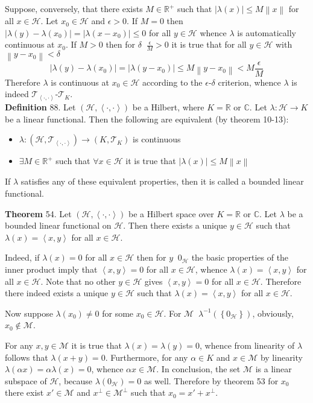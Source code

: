 \documentclass[a4paper]{article}
\newcommand{\obj}[1]{\left\{ #1 \right \}}
\newcommand{\brac}[1]{\left ( #1 \right )}
\newcommand{\abs}[1]{\left | #1 \right |}
\newcommand{\nrm}[1]{\left\| #1 \right \|}
\newcommand{\brkt}[1]{\left\langle #1 \right\rangle}
\newcommand{\Real}{\mathbb{R}}
\newcommand{\Cplx}{\mathbb{C}}
\newcommand{\Tcal}{\mathcal{T}}
\newcommand{\Hcal}{\mathcal{H}}
\newcommand{\Mcal}{\mathcal{M}}
\newcommand{\defn}{\mathop{\overset{\Delta}{=}}\nolimits}
\begin{document}
Suppose, conversely, that there exists $M\in \Real^+$ such that $\abs{\lambda\brac{x}}\leq M\nrm{x}$ for all $x\in \Hcal$. Let $x_0\in \Hcal$ and $\epsilon>0$. If $M=0$ then $\abs{\lambda\brac{y} - \lambda\brac{x_0}} = \abs{\lambda\brac{x-x_0}}\leq 0$ for all $y\in \Hcal$ whence $\lambda$ is automatically continuous at $x_0$. If $M>0$ then for $\delta\defn \frac{\epsilon}{M}>0$ it is true that for all $y\in \Hcal$ with $\nrm{y-x_0}<\delta$ \[\abs{\lambda\brac{y}-\lambda\brac{x_0}} = \abs{\lambda\brac{y-x_0}} \leq M\nrm{y-x_0}<M \frac{\epsilon}{M}\] Therefore $\lambda$ is continuous at $x_0\in \Hcal$ according to the $\epsilon$-$\delta$ criterion, whence $\lambda$ is indeed $\Tcal_{\brkt{\cdot,\cdot}}$-$\Tcal_K$.\\

\noindent \textbf{Definition} 88.
Let $\brac{\Hcal, \brkt{\cdot,\cdot}}$ be a Hilbert, where $K=\Real$ or $\Cplx$. Let $\lambda:\Hcal\to K$ be a linear functional. Then the following are equivalent (by theorem 10-13):\begin{itemize}
	\item $\lambda:\brac{\Hcal, \Tcal_{\brkt{\cdot,\cdot}}} \to \brac{K,\Tcal_K}$ is continuous
	\item $\exists M\in \Real^+$ such that $\forall x\in \Hcal$ it is true that $\abs{\lambda\brac{x}}\leq M\nrm{x}$
\end{itemize}
If $\lambda$ satisfies any of these equivalent properties, then it is called a bounded linear functional.

\label{thm:lin_func_inner_prod} \noindent \textbf{Theorem} 54.
Let $\brac{\Hcal, \brkt{\cdot, \cdot}}$ be a Hilbert space over $K=\Real$ or $\Cplx$. Let $\lambda$ be a bounded linear functional on $\Hcal$. Then there exists a unique $y\in \Hcal$ such that $\lambda\brac{x}=\brkt{x,y}$ for all $x\in \Hcal$.

Indeed, if $\lambda\brac{x}=0$ for all $x\in\Hcal$ then for $y\defn 0_\Hcal$ the basic properties of the inner product imply that $\brkt{x,y}=0$ for all $x\in\Hcal$, whence $\lambda\brac{x}=\brkt{x,y}$ for all $x\in\Hcal$. Note that no other $y\in\Hcal$ gives $\brkt{x,y}=0$ for all $x\in\Hcal$. Therefore there indeed exists a unique $y\in\Hcal$ such that $\lambda\brac{x}=\brkt{x,y}$ for all $x\in\Hcal$.

Now suppose $\lambda\brac{x_0}\neq 0$ for some $x_0\in\Hcal$. For $\Mcal\defn \lambda^{-1}\brac{\obj{0_\Hcal}}$, obviously, $x_0\notin\Mcal$.

For any $x,y\in\Mcal$ it is true that $\lambda\brac{x}=\lambda\brac{y}=0$, whence from linearity of $\lambda$ follows that $\lambda\brac{x+y}=0$. Furthermore, for any $\alpha \in K$ and $x\in\Mcal$ by linearity $\lambda\brac{\alpha x} = \alpha \lambda\brac{x} = 0$, whence $\alpha x\in\Mcal$. In conclusion, the set $\Mcal$ is a linear subspace of $\Hcal$, because $\lambda\brac{0_\Hcal}=0$ as well. Therefore by theorem 53 for $x_0$ there exist $x'\in\Mcal$ and $x^\perp\in \Mcal^\perp$ such that $x_0=x'+x^\perp$.
\end{document}
